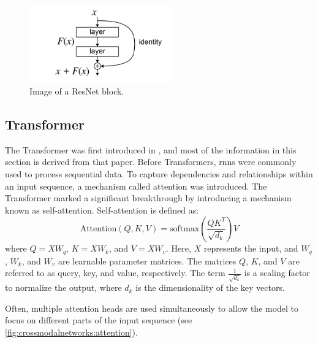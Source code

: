     \begin{figure}[h]
        \centering
        \includegraphics[width=0.55\textwidth]{Images/crossmodalnetworks/ResBlock.png}
        \caption{Image of a ResNet block.\cite{resnetpaper}}
        \label{fig:crossmodalnetworks:resblock}
    \end{figure}

    \subsection{Transformer}

    The Transformer was first introduced in \cite{attentionisallyouneed}, and most of the information in this section is derived from that paper. 
    Before Transformers, \acrfull{rnn}s were commonly used to process sequential data. 
    To capture dependencies and relationships within an input sequence, a mechanism called attention was introduced. 
    The Transformer marked a significant breakthrough by introducing a mechanism known as self-attention. 
    Self-attention is defined as:
    \begin{equation}
        \text{Attention}(Q, K, V) = \text{softmax}\left(\frac{QK^T}{\sqrt{d_k}}\right)V
        \label{equ:selfattention}
    \end{equation}
    where \(Q = XW_q\), \(K = XW_k\), and \(V = XW_v\). 
    Here, \(X\) represents the input, and \(W_{q}\), \(W_{k}\), and \(W_{v}\) are learnable parameter matrices. 
    The matrices \(Q\), \(K\), and \(V\) are referred to as query, key, and value, respectively. 
    The term \(\frac{1}{\sqrt{d_k}}\) is a scaling factor to normalize the output, where \(d_k\) is the dimensionality of the key vectors.
    
    Often, multiple attention heads are used simultaneously to allow the model to focus on different parts of the input sequence (see \cref{fig:crossmodalnetworks:attention}).
    

